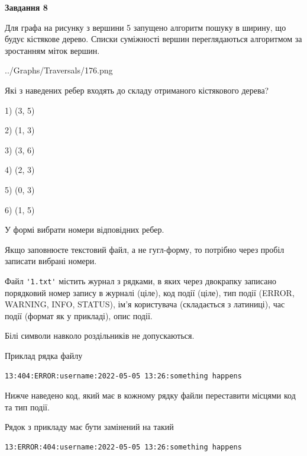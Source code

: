 \documentclass[12pt, ukrainian]{article}
\def\code#1{\Verb!#1!}
\begin{document}
{\begin {large}
{\begin {center}\textbf{Завдання 8}\end {center}}\par
Для графа на рисунку з вершини 5 запущено алгоритм пошуку в ширину, що будує кістякове дерево. Списки суміжності вершин переглядаються алгоритмом за зростанням міток вершин.\par
\begin{center}
	{../Graphs/Traversals/176.png}
\end{center}
\par Які з наведених ребер входять до складу отриманого кістякового дерева?\par
1) (3, 5)\par
2) (1, 3)\par
3) (3, 6)\par
4) (2, 3)\par
5) (0, 3)\par
6) (1, 5)\par
{\vskip 15pt} У формі вибрати номери відповідних ребер.


Якщо заповнюєте текстовий файл, а не гугл-форму, то потрібно через пробіл записа\-ти вибрані номери.\par
\newpage


Файл \code{'1.txt'} містить журнал з рядками, в яких через двокрапку записано поряд\-ко\-вий номер запису в журналі (ціле), код події (ціле), тип події (ERROR,\\ WARNING, INFO, STATUS), ім'я користувача (складається з латиниці), час події (фор\-мат як у прикладі), опис події.

Білі символи навколо роздільників не допускаються.

Приклад рядка файлу



\begin{verbatim}
13:404:ERROR:username:2022-05-05 13:26:something happens
\end{verbatim}


Нижче наведено код, який має в кожному рядку файли переставити місцями код та тип події.

Рядок з прикладу має бути замінений на такий



\begin{verbatim}
13:ERROR:404:username:2022-05-05 13:26:something happens
\end{verbatim}





\end{large}}
\end{document}
